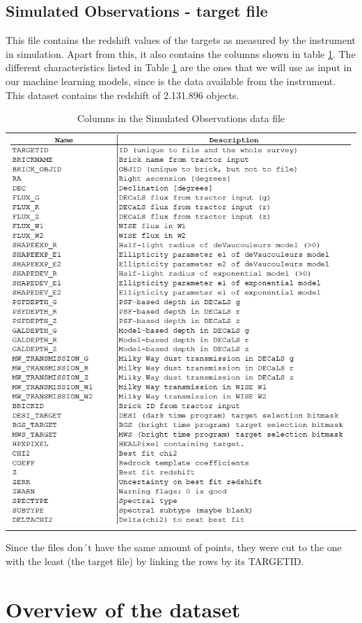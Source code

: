 \subsection{Simulated Observations - target file}
This file contains the redshift values of the targets as measured by the instrument in simulation. Apart from this, it also contains the columns shown in table \ref{tab:tar_car}. The different characteristics listed in Table \ref{tab:tar_car} are the ones that we will use as input in our machine learning models, since is the data available from the instrument. This dataset contains the redshift of 2.131.896 objects. 
\begin{table}[!htbp]
	\centering
	\begin{tabular}{c}
		\includegraphics[width=0.9\linewidth]{TeX_files/Imagenes/Imagen1}    
	\end{tabular} 
	\caption{Columns in the Simulated Observations data file }
	\label{tab:tar_car}
\end{table}
Since the files don´t have the same amount of points, they were cut to the one with the least (the target file) by linking the rows by its TARGETID. 
\section{Overview of the dataset}
